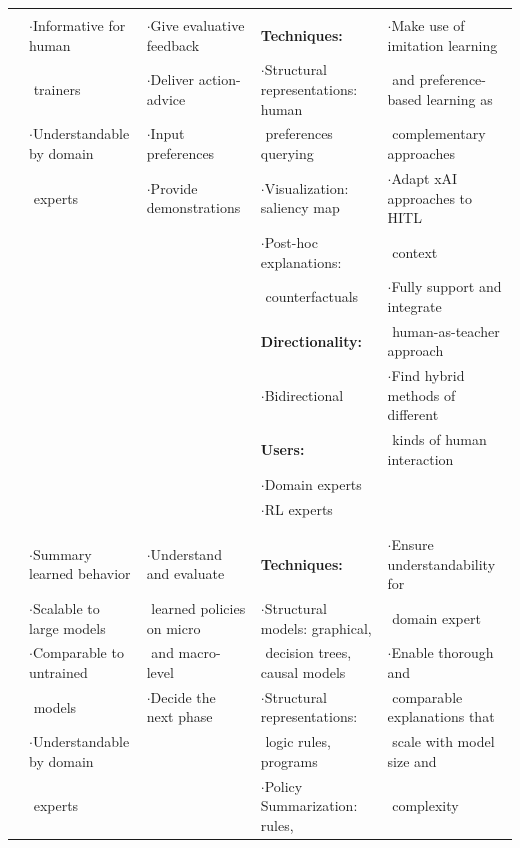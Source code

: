 \documentclass[twoside,11pt]{article}
\begin{document}
\begin{enumerate}
\begin{table}[!htbp]
{\begin{tabular}{|c||l|l|l|l|}
			&  &  & & \\
			& $\cdot$Informative for human  &	 $\cdot$Give evaluative feedback	&	 \textbf{Techniques:} 	&	$\cdot$Make use of imitation learning	\\
			& $ $ trainers&	$\cdot$Deliver action-advice	&	 $\cdot$Structural representations: human	&	$ $ and preference-based learning as 	\\
			& $\cdot$Understandable by domain &	 $\cdot$Input preferences 	&	 $ $ preferences querying 	&	$ $ complementary approaches	\\
			& $ $ experts&	 $\cdot$Provide demonstrations 	&	$\cdot$Visualization: saliency map  	&	$\cdot$Adapt xAI approaches to HITL\\
			&&&$\cdot$Post-hoc explanations: & $ $ context\\
			&&&$ $ counterfactuals & $\cdot$Fully support and integrate \\
			&&&\textbf{Directionality:} & $ $ human-as-teacher approach \\
			&  & 	&	 $\cdot$Bidirectional 	&$\cdot$Find hybrid methods of different\\
			&   & 	&	 \textbf{Users:}	&	$ $ kinds of human interaction	\\
			&   & 	&	 $\cdot$Domain experts	&	$ $	\\
			&   & 	&	 $\cdot$RL experts	&	\\
			&  &  & & \\
			\cline{1-5}
			\multirow{14}{*}{\rotatebox{90}{\hspace{0em}\textsc{Evaluation}}}
			&  &  & & \\
			& $\cdot$Summary learned behavior  & $\cdot$Understand and evaluate	&	 \textbf{Techniques:}	& $\cdot$Ensure understandability for 	\\
			&  $\cdot$Scalable to large models & $ $ learned policies on micro	&	 $\cdot$Structural models: graphical, 	&$ $ domain expert	\\
			& $\cdot$Comparable to untrained   & $ $ and macro-level	&	 $ $ decision trees, causal models	&	$\cdot$Enable thorough and \\
			& $ $ models   & $\cdot$Decide the next phase	&	 $\cdot$Structural representations:&	$ $ comparable explanations that  \\
			& $\cdot$Understandable by domain & & $ $ logic rules, programs& $ $ scale with model size and \\
			& $ $ experts & & $\cdot$Policy Summarization: rules, & $ $ complexity \\

\end{tabular}}
\end{table}
\end{enumerate}
\end{document}
